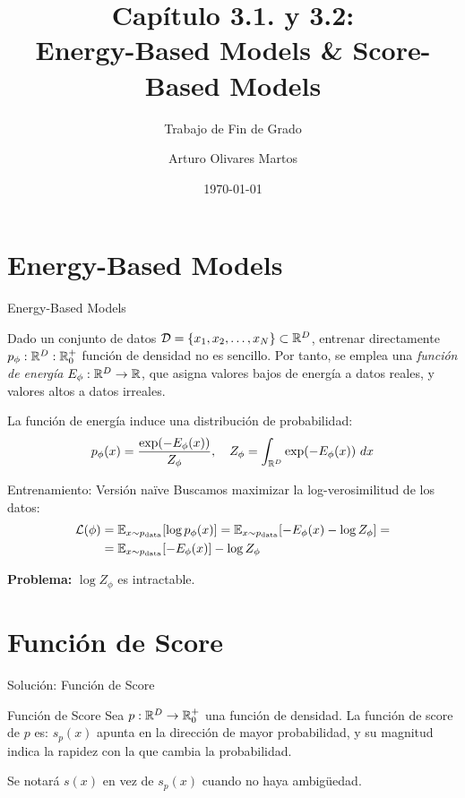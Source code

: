 \documentclass{beamer}
\title[3.1y2. EBM y SBM]{Capítulo 3.1. y 3.2:\\Energy-Based Models \& Score-Based Models}
\subtitle{Trabajo de Fin de Grado}
\author[Arturo]{Arturo Olivares Martos}
\institute[DGIIM - UGR]{Doble Grado en Ingeniería Informática y Matemáticas\\Universidad de Granada}
\date{\today}
\begin{document}
\begin{frame}
    \titlepage
\end{frame}

\section{Energy-Based Models}
\begin{frame}{Energy-Based Models}

    Dado un conjunto de datos $\mathcal{D} = \{x_1, x_2, \ldots, x_N\}\subset \mathbb{R}^D$, entrenar directamente $p_\phi:\mathbb{R}^D:\mathbb{R}^+_0$ función de densidad no es sencillo. Por tanto, se emplea una \emph{función de energía} $E_\phi:\mathbb{R}^D\to \mathbb{R}$, que asigna valores bajos de energía a datos reales, y valores altos a datos irreales.

    \pause
    La función de energía induce una distribución de probabilidad:
    \begin{equation*}
        p_\phi(x) = \frac{\exp(-E_\phi(x))}{Z_\phi}, \quad Z_\phi = \int_{\mathbb{R}^D} \exp(-E_\phi(x))\ dx
    \end{equation*}
\end{frame}

\begin{frame}{Entrenamiento: Versión naïve}
    Buscamos maximizar la log-verosimilitud de los datos:
    \begin{align*}
        \mathcal{L}(\phi) &= \mathbb{E}_{x\sim p_\text{data}}[\log p_\phi(x)] = \mathbb{E}_{x\sim p_\text{data}}[-E_\phi(x) - \log Z_\phi]
        = \\&=\mathbb{E}_{x\sim p_\text{data}}[-E_\phi(x)] - \log Z_\phi
    \end{align*}
    \pause
    \begin{center}
        \color{red} \textbf{Problema:} $\log Z_\phi$ es intractable.
    \end{center}
\end{frame}

\section{Función de Score}
\begin{frame}{Solución: Función de Score}
    \begin{definitionblock}{Función de Score}
        Sea $p:\mathbb{R}^D\to \mathbb{R}^+_0$ una función de densidad. La función de score de $p$ es:
        \pause
        $s_p(x)$ apunta en la dirección de mayor probabilidad, y su magnitud indica la rapidez con la que cambia la probabilidad.
    \end{definitionblock}

    \pause
    Se notará $s(x)$ en vez de $s_p(x)$ cuando no haya ambigüedad.
\end{frame}
\end{document}
